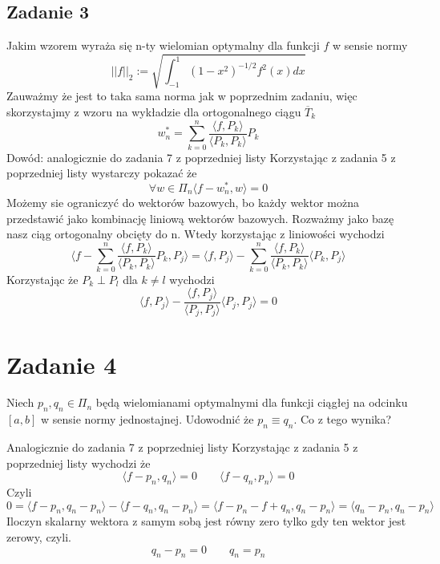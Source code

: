 \documentclass{article}
\begin{document}
\subsection*{Zadanie 3}
Jakim wzorem wyraża się n-ty wielomian optymalny dla funkcji $f$ w sensie normy
\[
  ||f||_2 := \sqrt{\int^1_{-1} 
    (1-x^2)^{-1/2} f^2 (x) dx
  }  
\]
Zauważmy że jest to taka sama norma jak w poprzednim zadaniu, więc skorzystajmy z wzoru na wykładzie dla ortogonalnego ciągu $\overline{T}_k$
\[
  w^*_n = \sum^n_{k=0} \frac{\langle f, P_k \rangle}{\langle P_k , P_k \rangle} P_k  
\]
Dowód:
analogicznie do zadania 7 z poprzedniej listy
Korzystając z zadania 5 z poprzedniej listy wystarczy pokazać że
\[ 
    \forall w \in \Pi_n \langle f - w^*_n , w \rangle = 0 
\]
Możemy sie ograniczyć do wektorów bazowych, bo każdy wektor można przedstawić jako kombinację liniową wektorów bazowych. Rozważmy jako bazę nasz ciąg ortogonalny obcięty do n.
Wtedy korzystając z liniowości wychodzi
\[
  \langle f -  \sum^n_{k=0} \frac{\langle f, P_k \rangle}{\langle P_k , P_k \rangle} P_k, P_j \rangle = \langle f, P_j \rangle - \sum^n_{k=0} \frac{\langle f, P_k \rangle}{\langle P_k , P_k \rangle}\langle  P_k, P_j \rangle
\]
Korzystając że $P_k \perp P_l$ dla $k \neq l$ wychodzi
\[
  \langle f, P_j\rangle - \frac{\langle f , P_j \rangle}{\langle P_j , P_j \rangle} \langle P_j, P_j \rangle = 0
\]
\section*{Zadanie 4}
Niech $p_n, q_n \in \Pi_n$ będą wielomianami optymalnymi dla funkcji ciągłej na odcinku $[a,b]$ w sensie normy jednostajnej. Udowodnić że $p_n \equiv q_n$. Co z tego wynika?

Analogicznie do zadania 7 z poprzedniej listy
Korzystając z zadania 5 z poprzedniej listy wychodzi
że 
\[ 
    \langle f - p_n , q_n\rangle = 0 \qquad \langle f - q_n , p_n\rangle = 0
\]
Czyli
\[
    0 = \langle f - p_n , q_n - p_n\rangle - \langle f - q_n , q_n - p_n\rangle =
    \langle f - p_n -f + q_n , q_n - p_n \rangle = \langle  q_n - p_n , q_n - p_n \rangle
    \]
    Iloczyn skalarny wektora z samym sobą jest równy zero tylko gdy ten wektor jest zerowy, czyli.
\[ q_n - p_n = 0 \qquad q_n = p_n \]
\end{document}

